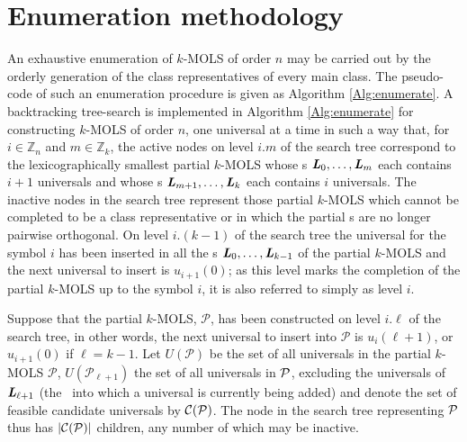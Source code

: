 \section{Enumeration methodology} \label{Menum}
An exhaustive enumeration of   $k$-MOLS of order $n$ may be carried out by    the orderly generation of the class representatives of every main class. The pseudo-code of such an enumeration procedure is given as Algorithm \ref{Alg:enumerate}.
A backtracking tree-search is implemented in Algorithm \ref{Alg:enumerate} for  constructing $k$-MOLS of order $n$,  one universal at a time in such a way that,
 for $i \in \mathbb{Z}_n$ and $m \in \mathbb{Z}_k$, the active nodes on level $i.m$  of the search tree correspond to the lexicographically smallest partial $k$-MOLS whose \lat s $\mbox{\bf \emph{L}}_0, \ldots, \mbox{\bf \emph{L}}_{m}$ each contains $i+1$
universals and whose \lat s $\mbox{\bf \emph{L}}_{m+1}, \ldots, \mbox{\bf \emph{L}}_{k}$ each contains $i$ universals.  The inactive nodes in the search tree represent  those partial $k$-MOLS which cannot be completed to be a  class representative  or in which the partial \lat s are no longer pairwise orthogonal. On level $i.(k\!-\!1)$  of the search tree the  universal for the symbol $i$ has been inserted in all the \lat s $\mbox{\bf \emph{L}}_0, \ldots, \mbox{\bf \emph{L}}_{k-1}$ of the partial $k$-MOLS  and the next universal to insert is $u_{i+1}{(0)}$; as this level marks the completion of the partial $k$-MOLS up to the symbol $i$, it is also referred to simply as level $i$.
 \begin{algorithm}[!b]
 \BlankLine
{}	
\caption{enumerateMOLS($\p$) \label{Alg:enumerate}%
}
\end{algorithm}


Suppose that the partial $k$-MOLS, $\mathcal{P}$, has been constructed on level $i.\ell$ of the search tree, in other words, the next universal to insert into $\mathcal{P}$ is   $u_i{(\ell+1)}$, or  $u_{i+1}{(0)}$ if $\ell = k-1$.   Let $U(\mathcal{P})$ be the set of all universals in the partial $k$-MOLS $\mathcal{P}$, $U(\mathcal{P}_{\ell+1})$ the set of  all universals in $\p$, excluding the universals of $\mbox{\bf \emph{L}}_{\ell+1}$ (the \lat \ into which a universal is currently being added) and denote the set of feasible candidate universals by $\mathcal{C}(\mathcal{P})$.  The node in the search tree representing $\p$ thus has $|\mathcal{C}(\mathcal{P})|$  children, any number of which may be inactive. %

